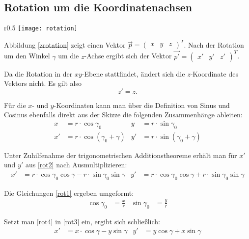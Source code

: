 \subsection{Rotation um die Koordinatenachsen}

\begin{wrapfigure}{r}{0.5\textwidth}
  \texttt{[image: rotation]}
  \vspace{-10pt}
  \caption{Rotation um die $z$-Achse.}
  \label{zrotation}
\end{wrapfigure}

Abbildung \ref{zrotation} zeigt einen Vektor $\vec p = \begin{pmatrix} x & y & z \end{pmatrix}^T$. Nach der Rotation um den Winkel $\gamma$ um die $z$-Achse ergibt sich der Vektor $\vec{p'} = \begin{pmatrix} x' & y' & z' \end{pmatrix}^T$.

Da die Rotation in der $xy$-Ebene stattfindet, ändert sich die $z$-Koordinate des Vektors nicht. Es gilt also
\begin{equation}
 z' = z.
\end{equation}

Für die $x$- und $y$-Koordinaten kann man über die Definition von Sinus und Cosinus ebenfalls direkt aus der Skizze die folgenden Zusammenhänge ableiten:
\begin{align}
  x &= r \cdot \cos{\gamma_0}            &   y &= r \cdot \sin{\gamma_0} \label{rot1} \\
 x' &= r \cdot \cos{(\gamma_0 + \gamma)} &  y' &= r \cdot \sin{(\gamma_0 + \gamma)} \label{rot2}
\end{align}

Unter Zuhilfenahme der trigonometrischen Additionstheoreme erhält man für $x'$ und $y'$ aus \ref{rot2} nach Ausmultiplizieren:
\begin{align}
 \label{rot3}
 x' &= r \cdot \cos \gamma_0 \cos \gamma - r \cdot \sin \gamma_0 \sin \gamma &  y' &= r \cdot \cos \gamma_0 \cos \gamma + r \cdot \sin \gamma_0 \sin \gamma
\end{align}

Die Gleichungen \ref{rot1} ergeben umgeformt:
\begin{align}
 \label{rot4}
 \cos \gamma_0 &= \frac{x}{r} & \sin \gamma_0 &= \frac{y}{r}
\end{align}

Setzt man \ref{rot4} in \ref{rot3} ein, ergibt sich schließlich:
\begin{align}
 x' &= x \cdot \cos \gamma - y \sin \gamma &  y' &= y \cos \gamma + x \sin \gamma
\end{align}

